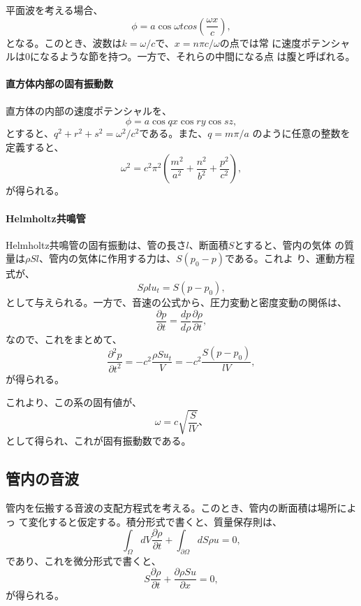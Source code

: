 平面波を考える場合、
\begin{equation}
 \phi = a \cos\omega t cos \left(\frac{\omega x}{c}\right),
\end{equation}
となる。このとき、波数は$k=\omega /c$で、$x = n\pi c/ \omega$の点では常
に速度ポテンシャルは0になるような節を持つ。一方で、それらの中間になる点
は腹と呼ばれる。

\paragraph{直方体内部の固有振動数}
直方体の内部の速度ポテンシャルを、
\begin{equation}
 \phi = a \cos qx \cos ry \cos sz,
\end{equation}
とすると、$q^2 + r^2 + s^2 = \omega^2 / c^2$である。また、$q = m\pi /a$
のように任意の整数を定義すると、
\begin{equation}
 \omega^2 = c^2\pi^2
  \left(\frac{m^2}{a^2} + 
  \frac{n^2}{b^2} +
 \frac{p^2}{c^2}\right),
\end{equation}
が得られる。

\paragraph{Helmholtz共鳴管}
Helmholtz共鳴管の固有振動は、管の長さ$l$、断面積$S$とすると、管内の気体
の質量は$\rho S l$、管内の気体に作用する力は、$S (p_0-p)$である。これよ
り、運動方程式が、
\begin{equation}
 S\rho l u_t = S (p - p_0),
\end{equation}
として与えられる。一方で、音速の公式から、圧力変動と密度変動の関係は、
\begin{equation}
 \frac{\partial p}{\partial t} = 
  \frac{dp}{d\rho}
  \frac{\partial \rho}{\partial t},
\end{equation}
なので、これをまとめて、
\begin{equation}
 \frac{\partial^2p}{\partial t^2} = 
  -c^2\frac{\rho S u_t}{V} = 
  -c^2 \frac{S (p - p_0)}{lV},
\end{equation}
が得られる。

これより、この系の固有値が、
\begin{equation}
 \omega = c\sqrt{\frac{S}{lV}}、
\end{equation}
として得られ、これが固有振動数である。

\subsection{管内の音波}
管内を伝搬する音波の支配方程式を考える。このとき、管内の断面積は場所によっ
て変化すると仮定する。積分形式で書くと、質量保存則は、
\begin{equation}
 \int_{\Omega}dV\frac{\partial\rho}{\partial t}
  + \int_{\partial\Omega}dS\rho u = 0,
\end{equation}
であり、これを微分形式で書くと、
\begin{equation}
 S\frac{\partial\rho}{\partial t} +
  \frac{\partial\rho Su}{\partial x} = 0,
\end{equation}
が得られる。

